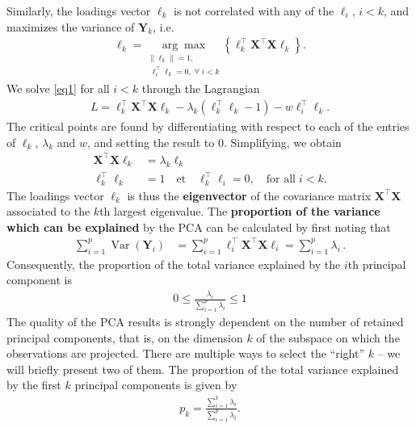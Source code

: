 Similarly, the loadings vector $\ell_k$ is not correlated with any of the $\ell_i$, $i<k$, and maximizes the variance of $\textbf{Y}_k$, i.e.
\begin{align}
\mathbf{\ell}_k=\underset{\substack{\|\ell_k\|=1,\\ \;\ell_{i}^{\!\top}\ell_k=0,\;\forall\;i<k}}{\arg \max} \left\{\ell^{\!\top}_k\textbf{X}^{\!\top} \textbf{X} \ell_k\right\}.\label{eq1}
\end{align}
We solve \eqref{eq1} for all  $i<k$ through the Lagrangian
\begin{align*}
L=\ell^{\!\top}_k\textbf{X}^{\!\top} \textbf{X} \ell_k-\lambda_k(\ell^{\!\top}_k\ell_k-1)-w\ell_{i}^{\!\top}\ell_k.
\end{align*}
The critical points are found by differentiating with respect to each of the entries of $\ell_k$, $\lambda_k$ and $w$, and setting the result to 0. Simplifying, we obtain  
\begin{align*}
\textbf{X}^{\!\top} \textbf{X} \ell_k&=\lambda_k\ell_k\\
\ell^{\!\top}_k\ell_k&=1 \quad\text{et}\quad\ell^{\!\top}_k\ell_i=0,\quad\text{for all}\; i<k.
\end{align*}
The loadings vector $\ell_k$ is thus the \textbf{eigenvector} of the covariance matrix $\textbf{X}^{\!\top} \textbf{X}$ associated to the $k$th largest eigenvalue. \newl
The \textbf{proportion of the variance which can be explained} by the PCA can be calculated by first noting that 
\begin{align*}
\sum_{i=1}^{p}\operatorname{Var}\left(\textbf{Y}_{i}\right) &=\sum_{i=1}^{p}\ell_{i}^{\!\top} \textbf{X}^{\!\top} \textbf{X} \ell_{i}=\sum_{i=1}^{p}\lambda_i \,.
\end{align*}
Consequently, the proportion of the total variance explained by the $i$th principal component is  
\begin{align*}
0\leq \frac{\lambda_i}{\sum_{i=1}^{p}\lambda_i }\leq 1
\end{align*}
The quality of the PCA results is strongly dependent on the number of retained principal components, that is, on the dimension $k$ of the subspace on which the observations are projected. There are multiple ways to select the ``right'' $k$ -- we will briefly present two of them. 
\newl The proportion of the total variance explained by the first $k$ principal components is given by  
\begin{align*}
p_k=\frac{\sum_{i=1}^{k} \lambda_i}{\sum_{i=1}^{p}\lambda_i}.
\end{align*}
